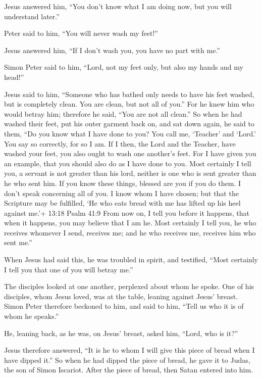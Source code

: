  Jesus answered him, ``You don't know what I am doing now,
but you will understand later.''

 Peter said to him, ``You will never wash my feet!''

Jesus answered him, ``If I don't wash you, you have no part with me.''

 Simon Peter said to him, ``Lord, not my feet only, but also
my hands and my head!''

 Jesus said to him, ``Someone who has bathed only needs to
have his feet washed, but is completely clean. You are clean, but not
all of you.''  For he knew him who would betray him;
therefore he said, ``You are not all clean.''  So when he
had washed their feet, put his outer garment back on, and sat down
again, he said to them, ``Do you know what I have done to you?
 You call me, `Teacher' and `Lord.' You say so correctly,
for so I am.  If I then, the Lord and the Teacher, have
washed your feet, you also ought to wash one another's feet.
 For I have given you an example, that you should also do
as I have done to you.  Most certainly I tell you, a
servant is not greater than his lord, neither is one who is sent greater
than he who sent him.  If you know these things, blessed
are you if you do them.  I don't speak concerning all of
you. I know whom I have chosen; but that the Scripture may be fulfilled,
`He who eats bread with me has lifted up his heel against me.'+ 13:18
Psalm 41:9  From now on, I tell you before it happens, that
when it happens, you may believe that I am he.  Most
certainly I tell you, he who receives whomever I send, receives me; and
he who receives me, receives him who sent me.''

 When Jesus had said this, he was troubled in spirit, and
testified, ``Most certainly I tell you that one of you will betray me.''

 The disciples looked at one another, perplexed about whom
he spoke.  One of his disciples, whom Jesus loved, was at
the table, leaning against Jesus' breast.  Simon Peter
therefore beckoned to him, and said to him, ``Tell us who it is of whom
he speaks.''

 He, leaning back, as he was, on Jesus' breast, asked him,
``Lord, who is it?''

 Jesus therefore answered, ``It is he to whom I will give
this piece of bread when I have dipped it.'' So when he had dipped the
piece of bread, he gave it to Judas, the son of Simon Iscariot.
 After the piece of bread, then Satan entered into him.


